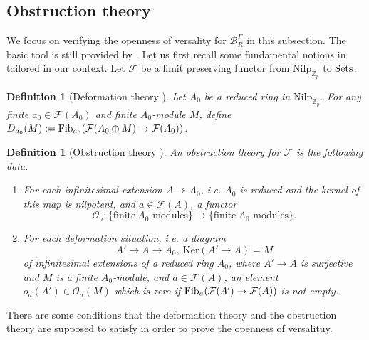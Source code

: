 \documentclass[10pt]{article}
\newtheorem{dfn}[thm]{Definition}
\numberwithin{equation}{section}
\newcommand{\bZ}{{\mathbb Z}}
\newcommand{\calB}{{\mathcal B}}
\newcommand{\calF}{{\mathcal F}}
\newcommand{\calO}{{\mathcal O}}
\newcommand{\Ker}{{\mathrm{Ker}}}           %
\newcommand{\Nilp}{\mathrm{Nilp}}
\begin{document}
\subsection{Obstruction theory}\label{obstruction}
We focus on verifying the openness of versality for $\calB_R^{\Gamma}$ in this subsection. The basic tool is still provided by \cite{Art74}. Let us first recall some fundamental notions in \cite{Art74} tailored in our context. Let $\calF$ be a limit preserving functor from $\Nilp_{\bZ_p}$ to $\rm Sets$.

\begin{dfn}[Deformation theory {\cite[2.5]{Art74}}]
    Let $A_0$ be a reduced ring in $\Nilp_{\bZ_p}$. For any finite $a_0\in \calF(A_0)$ and finite $A_0$-module $M$, define $D_{a_0}(M):={\rm Fib}_{a_0}(\calF(A_0\oplus M)\to \calF(A_0))$.
\end{dfn}

\begin{dfn}[Obstruction theory {\cite[2.6]{Art74}}]\label{def-obstruction theory}
    An obstruction theory for $\calF$ is the following data.
    \begin{enumerate}
        \item For each infinitesimal extension $A\twoheadrightarrow A_0$, i.e. $A_0$ is reduced and the kernel of this map is nilpotent, and $a\in \calF(A)$, a functor
        \[
        \calO_a:\{\text{finite}\ A_0\text{-modules}\}\to \{\text{finite}\ A_0\text{-modules}\}.
        \]
        \item For each deformation situation, i.e. a diagram
        \[
        A'\to A\to A_0, \ \Ker(A'\to A)=M
        \]
        of infinitesimal extensions of a reduced ring $A_0$, where $A'\to A$ is surjective and $M$ is a finite $A_0$-module, and $a\in \calF(A)$, an element $o_a(A')\in \calO_a(M)$ which is zero if ${\rm Fib}_a(\calF(A')\to \calF(A))$ is not empty.
    \end{enumerate}
\end{dfn}

There are some conditions that the deformation theory and the obstruction theory are supposed to satisfy in order to prove the openness of versalituy.
\end{document}
